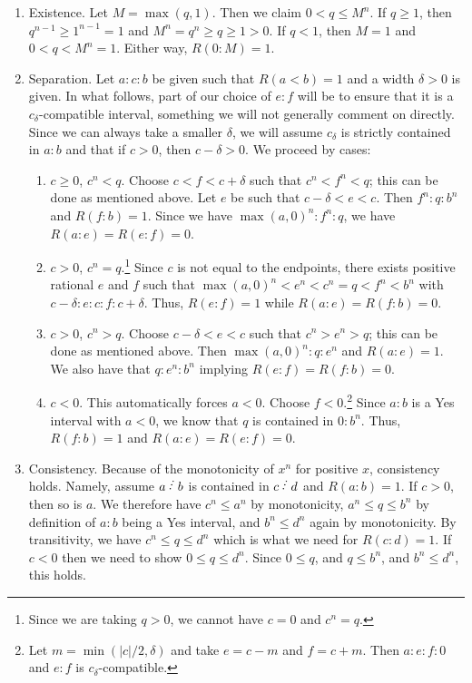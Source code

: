 \documentclass[12pt]{article}
\begin{document}
\begin{enumerate}
    \item Existence. Let $M = \max(q, 1)$. Then we claim $0 < q \leq M^n$. If $q \geq 1$, then $q^{n-1} \geq 1^{n-1} = 1$ and $M^n = q^n \geq q \geq 1 > 0$. If $ q < 1$, then $M=1$ and $0 < q < M^n = 1$. Either way, $R(0:M) = 1$. 
    \item Separation. Let $a: c: b$ be given such that $R(a < b)=1$ and a width $\delta > 0$ is given. In what follows, part of our choice of $e:f$ will be to ensure that it is a $c_\delta$-compatible interval, something we will not generally comment on directly. Since we can always take a smaller $\delta$, we will assume $c_\delta$ is strictly contained in $a:b$ and that if $ c> 0$, then $c-\delta > 0$. We proceed by cases:
    \begin{enumerate}
        \item $c \geq  0$, $c^n <q$. Choose $c < f < c+ \delta$ such that $c^n < f^n<q$; this can be done as mentioned above. Let $e$ be such that $c-\delta < e < c$. Then $f^n:q:b^n$ and $R(f:b)=1$. Since we have $\max(a, 0)^n :f^n:q$, we have $R(a:e) = R(e:f) =0$. 
        \item $c > 0$, $c^n = q$.\footnote{Since we are taking $ q> 0$, we cannot have $ c= 0$ and $c^n = q$.} Since $c$ is not equal to the endpoints, there exists positive rational $e$ and $f$ such that $\max(a,0)^n < e^n < c^n=q < f^n < b^n$ with $ c-\delta:e:c:f:c+\delta$. Thus, $R(e:f)=1$ while $R(a:e)=R(f:b)=0$. 
        \item $c >  0$, $c^n > q$. Choose $c-\delta < e < c$  such that $c^n > e^n > q$; this can be done as mentioned above. Then $\max(a, 0)^n:q:e^n$ and $R(a:e) = 1$. We also have that $q:e^n:b^n$ implying $R(e:f) = R(f:b) =0$. 
        \item $c < 0$. This automatically forces $a < 0$. Choose $f <0$.\footnote{ Let $m = \min(|c|/2, \delta)$ and take $e = c-m$ and $f = c+m$. Then $a:e:f:0$ and $e:f$ is $c_\delta$-compatible.} Since $a:b$ is a Yes interval with $a < 0$, we know that $q$ is contained in $0:b^n$. Thus, $R(f:b) = 1$ and $R(a:e) = R(e:f) = 0$. 
    \end{enumerate}
    \item Consistency. Because of the monotonicity of $x^n$ for positive $x$, consistency holds. Namely, assume $a\lte b$ is contained in $c \lte d$ and $R(a:b)=1$. If $c>0$, then so is $a$. We therefore have $c^n \leq a^n$ by monotonicity,  $a^n \leq q \leq b^n$ by definition of $a:b$ being a Yes interval, and $b^n \leq d^n$ again by monotonicity. By transitivity, we have $c^n \leq q \leq d^n$ which is what we need for $R(c:d) = 1$.  If $c<0$ then we need to show $0 \leq q \leq d^n$. Since $0 \leq q$, and $q \leq  b^n$, and $b^n \leq d^n$, this holds. 


\end{enumerate}
\end{document}
